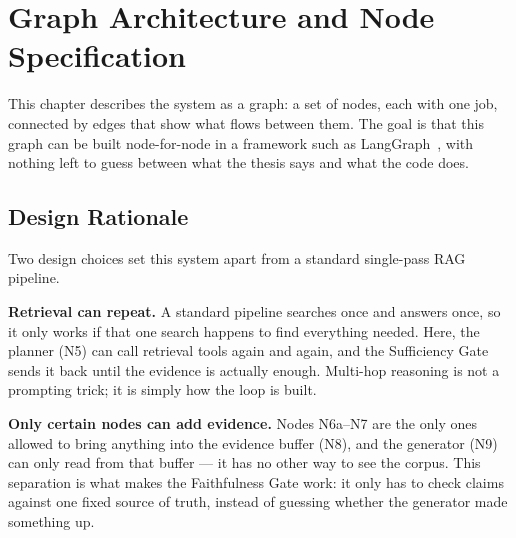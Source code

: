 \chapter{Graph Architecture and Node Specification}
\label{sec:graph}

This chapter describes the system as a graph: a set of nodes, each with one job,
connected by edges that show what flows between them. The goal is that this graph
can be built node-for-node in a framework such as LangGraph~\cite{langgraph}, with nothing left to
guess between what the thesis says and what the code does.

\section{Design Rationale}

Two design choices set this system apart from a standard single-pass RAG pipeline.

\textbf{Retrieval can repeat.} A standard pipeline searches once and answers once,
so it only works if that one search happens to find everything needed. Here, the
planner (N5) can call retrieval tools again and again, and the Sufficiency Gate
sends it back until the evidence is actually enough. Multi-hop reasoning is not a
prompting trick; it is simply how the loop is built.

\textbf{Only certain nodes can add evidence.} Nodes N6a--N7 are the only ones
allowed to bring anything into the evidence buffer (N8), and the generator (N9) can
only read from that buffer --- it has no other way to see the corpus. This
separation is what makes the Faithfulness Gate work: it only has to check claims
against one fixed source of truth, instead of guessing whether the generator made
something up.

